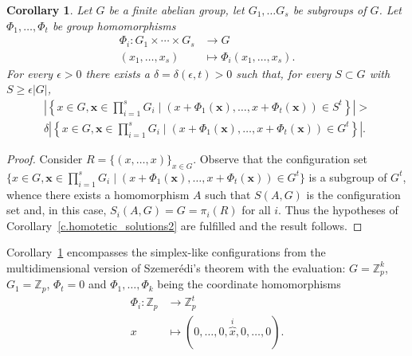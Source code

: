 \documentclass[10pt]{article}
\newtheorem{corollary}[theorem]{Corollary}
\newcommand{\Z}{\mathbb Z}
\begin{document}
\begin{corollary}\label{c.homotetic_solutions}
	Let $G$ be a finite abelian group, let $G_1,\ldots G_s$ be subgroups of $G$. Let $\Phi_1,\ldots,\Phi_t$ be group homomorphisms
\begin{align}
		\Phi_i: G_1\times \cdots\times G_s &\to G \nonumber \\
		(x_1,\ldots,x_s) &\mapsto \Phi_i(x_1,\ldots,x_s). \nonumber
\end{align}
For every $\epsilon>0$ there exists a $\delta=\delta(\epsilon,t)>0$
such that, for every $S\subset G$ with $S\geq \epsilon |G|$,
\begin{multline}
	\left|\left\{x\in G, \mathbf{x}\in \prod_{i=1}^s G_i \; |\; (x+\Phi_1(\mathbf{x}),
	\ldots,x+\Phi_t(\mathbf{x}))\in S^t\right\}\right|>\\ 
	\delta 
	\left|\left\{x\in G, \mathbf{x}\in \prod_{i=1}^s G_i  \;|\; (x+\Phi_1(\mathbf{x}),
	\ldots,x+\Phi_t(\mathbf{x}))\in G^t\right\}\right|. \nonumber
\end{multline}
\end{corollary}

\begin{proof}
	Consider $R=\{(x,\ldots,x)\}_{x\in G}$.
	Observe that the configuration set $\{x\in G, \mathbf{x}\in \prod_{i=1}^s G_i  \;|\; (x+\Phi_1(\mathbf{x}),
	\ldots,x+\Phi_t(\mathbf{x}))\in G^t\}$ is a subgroup of $G^t$, whence there exists a homomorphism $A$ such that $S(A,G)$ is the configuration set and, in this case, $S_i(A,G)=G=\pi_i(R)$ for all $i$. Thus the hypotheses of Corollary~\ref{c.homotetic_solutions2} are fulfilled and the result follows.
\end{proof}

Corollary~\ref{c.homotetic_solutions} encompasses the simplex-like configurations from the multidimensional version of Szemer\'edi's theorem with the evaluation: $G=\Z_p^k$, $G_1=\Z_p$, $\Phi_t=0$ and $\Phi_1,\ldots,\Phi_{k}$ being the coordinate homomorphisms 
\begin{align}
	\Phi_i: \Z_p&\to \Z_p^t \nonumber \\
	x&\mapsto (0,\ldots,0,\overbrace{x}^{i},0,\ldots,0). \nonumber
\end{align}
\end{document}
